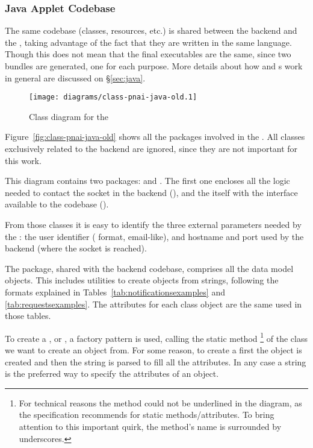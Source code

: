 \subsubsection{Java Applet Codebase} %
\label{ssub:appletcodeold}

The same codebase (classes, resources, etc.) is shared between the  backend and the , taking advantage of the fact that they are written in the same language.
Though this does not mean that the final executables are the same, since two bundles are generated, one for each purpose.
More details about how  and s work in general are discussed on \S\vref{sec:java}.

\begin{figure}[htbp]
  \centering
    \texttt{[image: diagrams/class-pnai-java-old.1]}
  \caption{Class diagram for the }
  \label{fig:class-pnai-java-old}
\end{figure}

Figure~\vref{fig:class-pnai-java-old} shows all the packages involved in the .
All classes exclusively related to the  backend are ignored, since they are not important for this work.

This diagram contains two packages:  and .
The first one encloses all the logic needed to contact the socket in the backend (), and the  itself with the interface available to the  codebase ().

From those classes it is easy to identify the three external parameters needed by the : the user identifier ( format, email-like), and hostname and port used by the backend (where the socket is reached).

The  package, shared with the backend codebase, comprises all the data model objects.
This includes utilities to create objects from strings, following the formats explained in Tables~\vref{tab:notificationsexamples} and \vref{tab:requestsexamples}.
The attributes for each class object are the same used in those tables.

To create a ,  or , a factory pattern is used, calling the static method \footnote{For technical reasons the method  could not be underlined in the diagram, as the  specification recommends for static methods/attributes.
To bring attention to this important quirk, the method's name is surrounded by underscores.} of the class we want to create an object from.
For some reason, to create a  first the object is created and then the string is parsed to fill all the attributes.
In any case a string is the preferred way to specify the attributes of an object.

